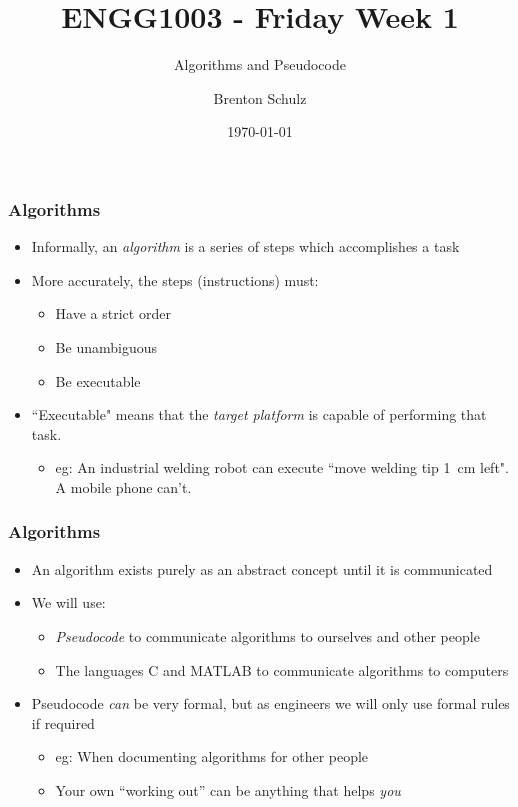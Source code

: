 \documentclass[14pt]{beamer}
\title{ENGG1003 - Friday Week 1}
\subtitle{Algorithms and Pseudocode}
\author{Brenton Schulz}
\institute{University of Newcastle}
\date{\today}
\begin{document}
\titlepage

\begin{frame} %
\frametitle{Algorithms}
\begin{itemize}
\item Informally, an \textit{algorithm} is a series of steps which accomplishes a task
\item More accurately, the steps (instructions) must:
	\begin{itemize}
		\item Have a strict order
		\item Be unambiguous
		\item Be executable
	\end{itemize}
\item ``Executable" means that the \textit{target platform} is capable of performing that task.
	\begin{itemize}
		\item eg: An industrial welding robot can execute ``move welding tip 1~cm left". A mobile phone can't.
	\end{itemize}
\end{itemize}
\end{frame}

\begin{frame} %
\frametitle{Algorithms}
\begin{itemize}
\item An algorithm exists purely as an abstract concept until it is communicated
\item We will use:
	\begin{itemize}
	\item \textit{Pseudocode} to communicate algorithms to ourselves and other people
	\item The languages C and MATLAB to communicate algorithms to computers
	\end{itemize}
\item Pseudocode \textit{can} be very formal, but as engineers we will only use formal rules if required
	\begin{itemize}
		\item eg: When documenting algorithms for other people
		\item Your own ``working out'' can be anything that helps \textit{you}
	\end{itemize}
\end{itemize}
\end{frame}
\end{document}
